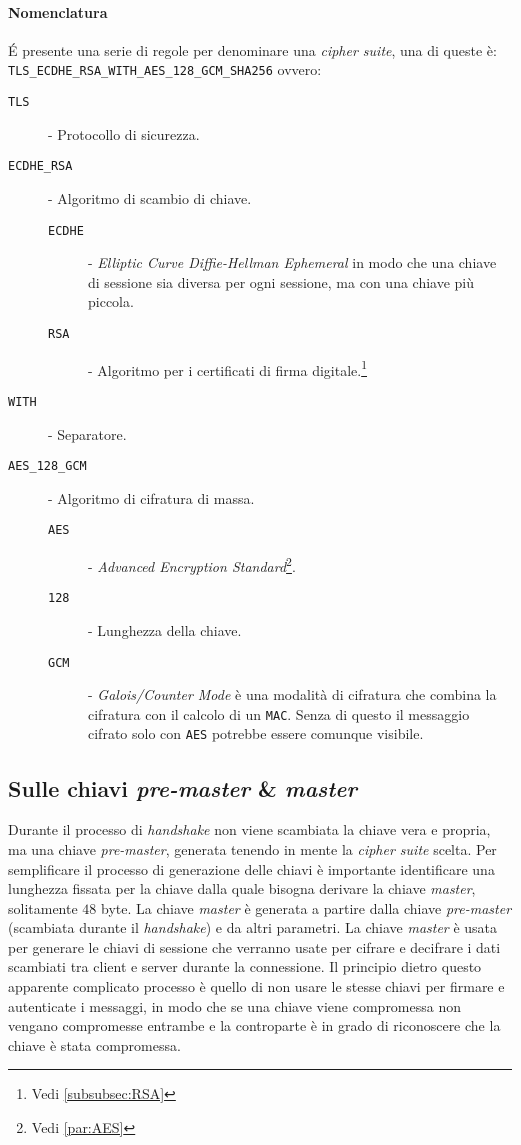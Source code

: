         \paragraph{Nomenclatura} É presente una serie di regole per denominare una \textit{cipher suite}, una di queste è:\newline
        \texttt{TLS\_ECDHE\_RSA\_WITH\_AES\_128\_GCM\_SHA256} ovvero:\begin{description}
            \item[\texttt{TLS}] - Protocollo di sicurezza.
            \item[\texttt{ECDHE\_RSA}] - Algoritmo di scambio di chiave.\begin{description}
                \item[\texttt{ECDHE}] - \textit{Elliptic Curve Diffie-Hellman Ephemeral} in modo che una chiave di sessione sia diversa per ogni sessione, ma con una chiave più piccola.
                \item[\texttt{RSA}] - Algoritmo per i certificati di firma digitale.\footnote{Vedi \ref{subsubsec:RSA} }
            \end{description}   
            \item[\texttt{WITH}] - Separatore.
            \item[\texttt{AES\_128\_GCM}] - Algoritmo di cifratura di massa.\begin{description}
                \item[\texttt{AES}] - \textit{Advanced Encryption Standard}\footnote{Vedi \ref{par:AES} }.
                \item[\texttt{128}] - Lunghezza della chiave.
                \item[\texttt{GCM}] - \textit{Galois/Counter Mode} è una modalità di cifratura che combina la cifratura con il calcolo di un \texttt{MAC}. Senza di questo il messaggio cifrato solo con \texttt{AES} potrebbe essere comunque visibile.
            \end{description}
        \end{description}
    \subsection{Sulle chiavi \textit{pre-master} \& \textit{master}}
        Durante il processo di \textit{handshake} non viene scambiata la chiave vera e propria, ma una chiave \textit{pre-master}, generata tenendo in mente la \textit{cipher suite} scelta. Per semplificare il processo di generazione delle chiavi è importante identificare una lunghezza fissata per la chiave dalla quale bisogna derivare la chiave \textit{master}, solitamente $ 48 $ byte. La chiave \textit{master} è generata a partire dalla chiave \textit{pre-master} (scambiata durante il \textit{handshake}) e da altri parametri. La chiave \textit{master} è usata per generare le chiavi di sessione che verranno usate per cifrare e decifrare i dati scambiati tra client e server durante la connessione. Il principio dietro questo apparente complicato processo è quello di non usare le stesse chiavi per firmare e autenticate i messaggi, in modo che se una chiave viene compromessa non vengano compromesse entrambe e la controparte è in grado di riconoscere che la chiave è stata compromessa.
